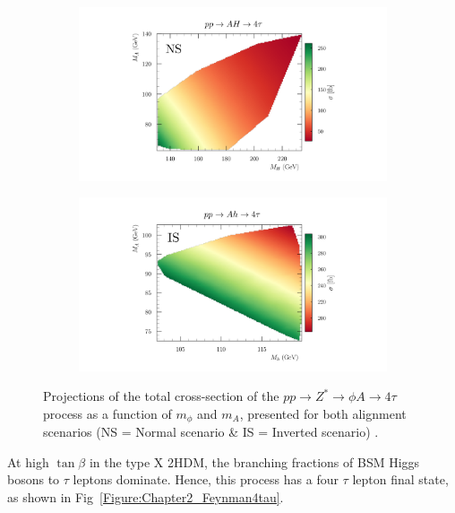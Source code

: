 \begin{figure}[h]
    \centering
    \begin{subfigure}[b]{0.8\textwidth}
        \centering
        \includegraphics[width=\textwidth]{Figures/Chapter2/4tau_ProductionXS_NS.png}
    \end{subfigure}
    \begin{subfigure}[b]{0.8\textwidth}
        \centering
        \includegraphics[width=\textwidth]{Figures/Chapter2/4tau_ProductionXS_IS.png}
    \end{subfigure}

    \caption{Projections of the total cross-section of the $pp \to Z^* \to \phi A \to 4\tau$ process as a function of $m_\phi$ and $m_A$, presented for both alignment scenarios (NS = Normal scenario \& IS = Inverted scenario) \cite{TypeX_2HDM}.}
    \label{Figure:Chapter2_4tau_ProductionXS}
\end{figure}

At high $\tan\beta$ in the type X 2HDM, the branching fractions of BSM Higgs bosons to $\tau$ leptons dominate. Hence, this process has a four $\tau$ lepton final state, as shown in Fig~\ref{Figure:Chapter2_Feynman4tau}. 

